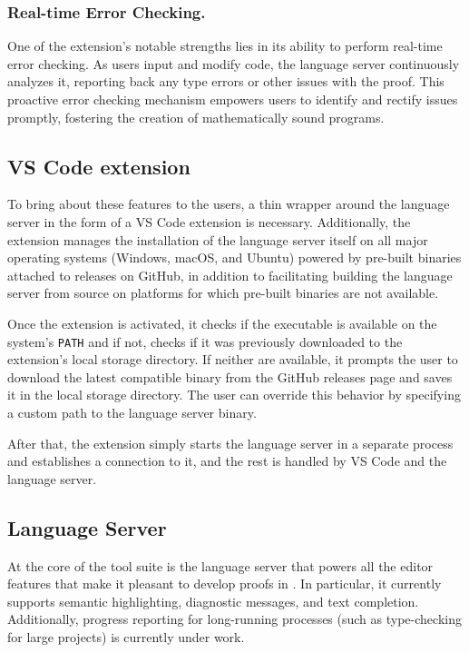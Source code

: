 \subsubsection{Real-time Error Checking.}

One of the extension's notable strengths lies in its ability to perform real-time error checking.
As users input and modify code, the language server continuously analyzes it,
reporting back any type errors or other issues with the proof.
This proactive error checking mechanism empowers users to identify and rectify issues promptly,
fostering the creation of mathematically sound programs.

\subsection{VS Code extension}

To bring about these features to the users, a thin wrapper around the language server in the form of a VS Code extension is necessary.
Additionally, the extension manages the installation of the language server itself on all major operating systems (Windows, macOS, and Ubuntu)
powered by pre-built binaries attached to releases on GitHub,
in addition to facilitating building the language server from source on platforms
for which pre-built binaries are not available.

Once the extension is activated, it checks if the \Rzk{} executable is available on the system's
\texttt{PATH} and if not, checks if it was previously downloaded to the extension's local storage directory.
If neither are available, it prompts the user to download the latest compatible binary from the GitHub
releases page and saves it in the local storage directory.
The user can override this behavior by specifying a custom path to the language server binary.

After that, the extension simply starts the language server in a separate process and establishes a connection to it,
and the rest is handled by VS Code and the language server.

\subsection{\Rzk{} Language Server}

At the core of the \Rzk{} tool suite is the language server that powers all the editor features that make it pleasant to develop proofs in \Rzk{}. In particular, it currently supports semantic highlighting, diagnostic messages, and text completion. Additionally, progress reporting for long-running processes (such as type-checking for large projects) is currently under work.

